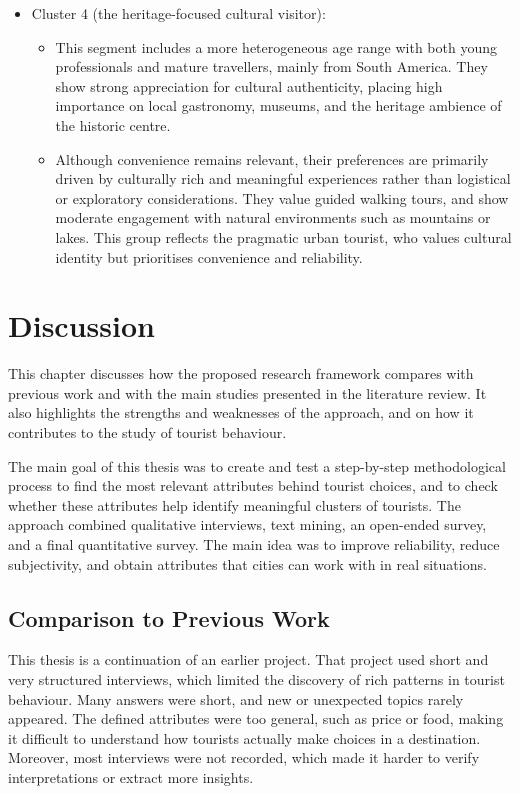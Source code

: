 \documentclass[a4paper, 12pt, twoside]{report}  %
\begin{document}
\begin{itemize}
    \item Cluster 4 (the heritage-focused cultural visitor):
    \begin{itemize}
        \item This segment includes a more heterogeneous age range with both young professionals and mature travellers, mainly from South America. They show strong appreciation for cultural authenticity, placing high importance on local gastronomy, museums, and the heritage ambience of the historic centre.
        \item Although convenience remains relevant, their preferences are primarily driven by culturally rich and meaningful experiences rather than logistical or exploratory considerations. They value guided walking tours, and show moderate engagement with natural environments such as mountains or lakes. This group reflects the pragmatic urban tourist, who values cultural identity but prioritises convenience and reliability.
    \end{itemize}
\end{itemize}


\chapter{Discussion}

\indent This chapter discusses how the proposed research framework compares with previous work and with the main studies presented in the literature review. It also highlights the strengths and weaknesses of the approach, and on how it contributes to the study of tourist behaviour.

\indent  The main goal of this thesis was to create and test a step-by-step methodological process to find the most relevant attributes behind tourist choices, and to check whether these attributes help identify meaningful clusters of tourists. The approach combined qualitative interviews, text mining, an open-ended survey, and a final quantitative survey. The main idea was to improve reliability, reduce subjectivity, and obtain attributes that cities can work with in real situations.

\section{Comparison to Previous Work}

\indent This thesis is a continuation of an earlier project. That project used short and very structured interviews, which limited the discovery of rich patterns in tourist behaviour. Many answers were short, and new or unexpected topics rarely appeared. The defined attributes were too general, such as price or food, making it difficult to understand how tourists actually make choices in a destination. Moreover, most interviews were not recorded, which made it harder to verify interpretations or extract more insights.
\end{document}
